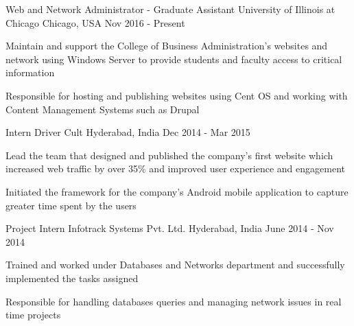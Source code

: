 \begin{cventries}
  \cventry
    {Web and Network Administrator - Graduate Assistant}
    {University of Illinois at Chicago}
    {Chicago, USA}
    {Nov 2016 - Present}
    {
      \begin{cvitems}
        \item {Maintain and support the College of Business Administration's websites and network using Windows Server to provide students and faculty access to critical information}
        \item {Responsible for hosting and publishing websites using Cent OS and working with Content Management Systems such as Drupal}
      \end{cvitems}
    }
  \cventry
    {Intern}
    {Driver Cult}
    {Hyderabad, India}
    {Dec 2014 - Mar 2015}
    {
      \begin{cvitems}
        \item {Lead the team that designed and published the company’s first website which increased web traffic by over 35\% and improved user experience and engagement}
        \item {Initiated the framework for the company’s Android mobile application to capture greater time spent by the users }
      \end{cvitems}
    }
  \cventry
    {Project Intern}
    {Infotrack Systems Pvt. Ltd.}
    {Hyderabad, India}
    {June 2014 - Nov 2014}
    {
      \begin{cvitems}
        \item {Trained and worked under Databases and Networks department and successfully implemented the tasks assigned}
        \item {Responsible for handling databases queries and managing network issues in real time projects}
      \end{cvitems} 
    }
\end{cventries}
